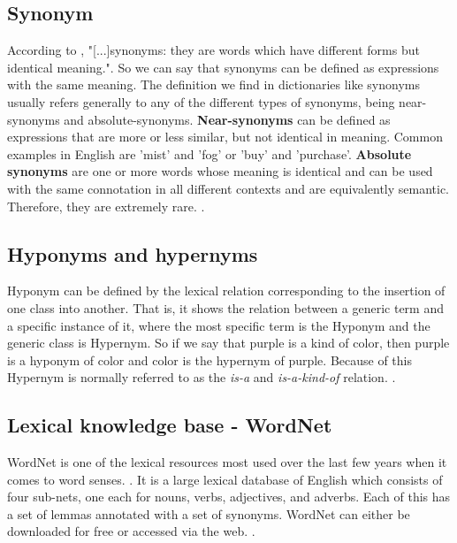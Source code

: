 \subsection{Synonym}

According to , "[...]synonyms: they are words which have different forms but identical meaning.". So we can say that synonyms can be defined as expressions with the same meaning. The definition we find in dictionaries like synonyms usually refers generally to any of the different types of synonyms, being near-synonyms and absolute-synonyms. \textbf{Near-synonyms} can be defined as expressions that are more or less similar, but not identical in meaning. Common examples in English are ’mist’ and ’fog’ or ’buy’ and ’purchase’. \textbf{Absolute synonyms} are one or more words whose meaning is identical and can be used with the same connotation in all different contexts and are equivalently semantic.  Therefore, they are extremely rare. \cite{lyons1995linguistic}.

\subsection{Hyponyms and hypernyms}

Hyponym can be defined by the lexical relation corresponding to the insertion of one class into another. That is, it shows the relation between a generic term and a specific instance of it, where the most specific term is the Hyponym and the generic class is Hypernym. So if we say that purple is a kind of color, then purple is a hyponym of color and color is the hypernym of purple. Because of this Hypernym is normally referred to as the \textit{is-a} and \textit{is-a-kind-of} relation. \cite[p.~88]{cruse1986lexical}.

\subsection{Lexical knowledge base - WordNet}

WordNet is one of the lexical resources most used over the last few years when it comes to word senses. \cite{fellbaum1998}. It is a large lexical database of English which consists of four sub-nets, one each for nouns, verbs, adjectives, and adverbs. Each of this has a set of lemmas annotated with a set of synonyms. WordNet can either be downloaded for free or accessed via the web. \cite{wordnetOnline2010}.

